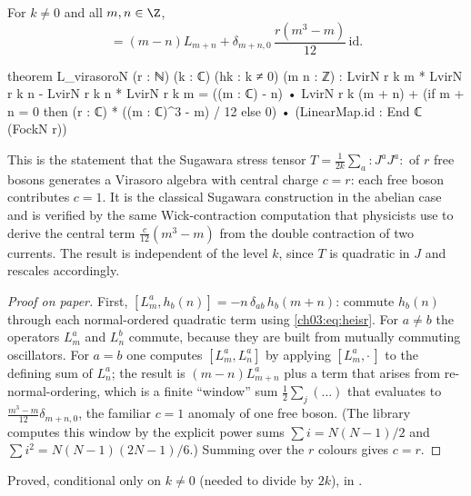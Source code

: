 \begin{theorem}[Virasoro relation, $c=r$]\label{ch03:thm:virasoroN}
For $k\ne0$ and all $m,n\in\Z$,
\begin{equation*}
[L_m,L_n]=(m-n)L_{m+n}+\delta_{m+n,0}\,\frac{r(m^3-m)}{12}\,\mathrm{id}.
\end{equation*}
\end{theorem}
\begin{leancode}
theorem L_virasoroN (r : ℕ) (k : ℂ) (hk : k ≠ 0) (m n : ℤ) :
    LvirN r k m * LvirN r k n - LvirN r k n * LvirN r k m
      = ((m : ℂ) - n) • LvirN r k (m + n)
        + (if m + n = 0 then (r : ℂ) * ((m : ℂ)^3 - m) / 12 else 0)
            • (LinearMap.id : End ℂ (FockN r))
\end{leancode}

\begin{physics}
This is the statement that the Sugawara stress tensor $T=\frac1{2k}\sum_a{:}J^aJ^a{:}$ of $r$ free bosons generates a Virasoro algebra with central charge $c=r$: each free boson contributes $c=1$. It is the classical Sugawara construction in the abelian case and is verified by the same Wick-contraction computation that physicists use to derive the central term $\frac{c}{12}(m^3-m)$ from the double contraction of two currents. The result is independent of the level $k$, since $T$ is quadratic in $J$ and rescales accordingly.
\end{physics}

\begin{proof}[Proof on paper]
First, $[L^a_m,h_b(n)]=-n\,\delta_{ab}\,h_b(m+n)$: commute $h_b(n)$ through each normal-ordered
quadratic term using \eqref{ch03:eq:heisr}. For $a\neq b$ the operators $L^a_m$ and $L^b_n$ commute,
because they are built from mutually commuting oscillators. For $a=b$ one computes
$[L^a_m,L^a_n]$ by applying $[L^a_m,\cdot\,]$ to the defining sum of $L^a_n$; the result is
$(m-n)L^a_{m+n}$ plus a term that arises from re-normal-ordering, which is a finite ``window'' sum
$\frac{1}{2}\sum_{j}(\ldots)$ that evaluates to $\frac{m^3-m}{12}\delta_{m+n,0}$, the familiar $c=1$
anomaly of one free boson. (The library computes this window by the explicit power sums
$\sum i=N(N-1)/2$ and $\sum i^2=N(N-1)(2N-1)/6$.) Summing over the $r$ colours gives $c=r$.
\end{proof}

\begin{status}
Proved, conditional only on $k\neq0$ (needed to divide by $2k$), in
.
\end{status}

